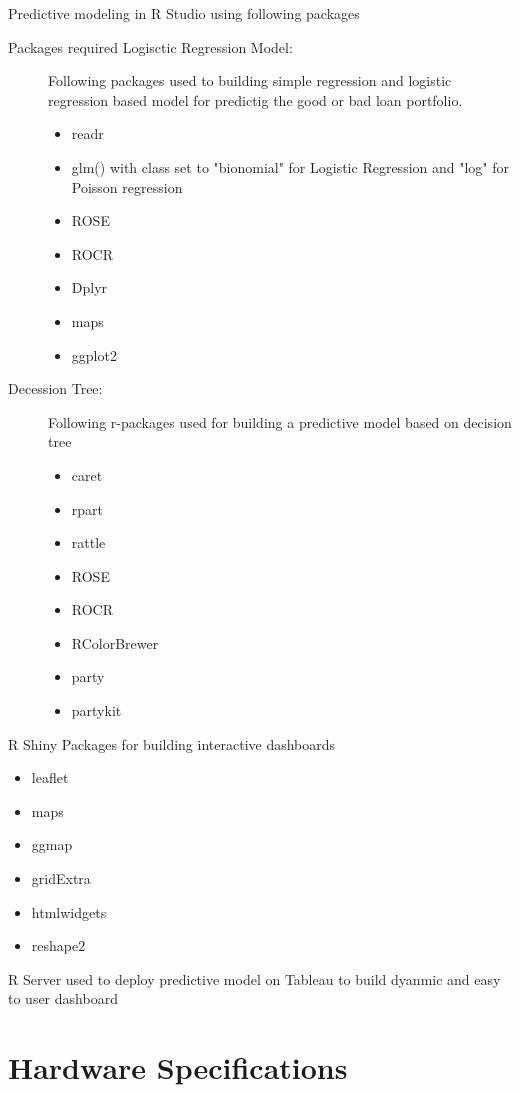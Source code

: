 Predictive modeling in R Studio using following packages
\begin{description}
  \item[Packages required Logisctic Regression Model:] Following packages used to building simple regression and logistic regression based model for predictig the good or bad loan portfolio.
   \begin{itemize}
        \item readr
        \item glm() with class set to "bionomial" for Logistic Regression and "log" for Poisson regression
        \item ROSE
        \item ROCR
        \item Dplyr
        \item maps
        \item ggplot2
    \end{itemize}
  \item[Decession Tree:] Following r-packages used for building a predictive model based on decision tree
    \begin{itemize}
        \item caret
        \item rpart
        \item rattle
        \item ROSE
        \item ROCR
        \item RColorBrewer
        \item party
        \item partykit
    \end{itemize}

\end{description}



R Shiny Packages for building interactive dashboards
\begin{itemize}
  \item leaflet
  \item maps
  \item ggmap
  \item gridExtra
  \item htmlwidgets
  \item reshape2
\end{itemize}

R Server used to deploy predictive model on Tableau to build dyanmic and easy to user dashboard

\section{Hardware Specifications}

